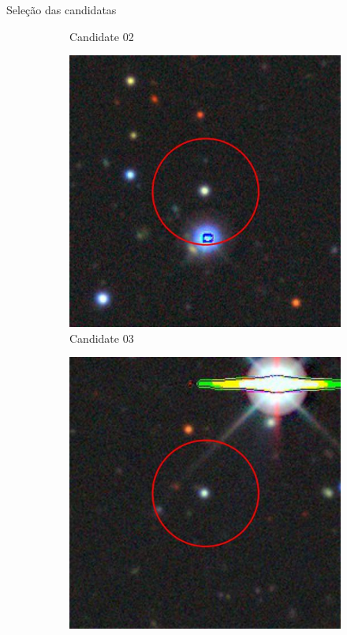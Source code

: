 \begin{frame}[c]{Seleção das candidatas}
\begin{figure}[]
\begin{subfigure}[b]{0.13\textwidth}
            \caption{Candidate 02}
        \end{subfigure}
        \begin{subfigure}[b]{0.13\textwidth}
            \includegraphics[width=\textwidth]{images/candidata_final/03.jpg}
            \caption{Candidate 03}
        \end{subfigure}
        \begin{subfigure}[b]{0.13\textwidth}
            \includegraphics[width=\textwidth]{images/candidata_final/04.jpg}

\end{subfigure}
\end{figure}
\end{frame}
